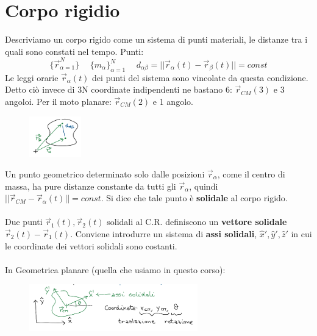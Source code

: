 \newpage
\section{Corpo rigidio}
Descriviamo un corpo rigido come un sistema di punti materiali, le distanze tra
i quali sono constati nel tempo. Punti: 
$$\{\vec{r}_{\alpha=1}^N\} \hspace{15pt} \{m_{\alpha}\}_{\alpha=1}^N \hspace{15pt} d_{\alpha\beta} = ||\vec{r}_{\alpha}(t) - \vec{r}_{\beta}(t)|| = const$$
Le leggi orarie $\vec{r}_{\alpha}(t)$ dei punti del sistema sono vincolate da questa condizione. Detto ciò invece di 3N coordinate indipendenti
ne bastano 6: $\vec{r}_{CM}(3)$ e 3 angoloi. Per il moto planare: $\vec{r}_{CM}(2)$ e 1 angolo.
\begin{figure}[h!]
    \centering
    \includegraphics[width=0.2\textwidth]{images/corpo-rigido.png}
\end{figure}

\hspace{-15pt}Un punto geometrico determinato solo dalle posizioni $\vec{r}_{\alpha}$, come il centro di massa, ha pure distanze constante da tutti gli $\vec{r}_{\alpha}$, quindi $||\vec{r}_{CM} - \vec{r}_{\alpha}(t)|| = const$.
Si dice che tale punto è \textbf{solidale} al corpo rigido.\\\\
Due punti $\vec{r}_1(t), \vec{r}_2(t)$ solidali al C.R. definiscono un \textbf{vettore solidale} $\vec{r}_2(t) - \vec{r}_1(t)$. Conviene introdurre
un sistema di \textbf{assi solidali}, $\hat{x}', \hat{y}', \hat{z}'$ in cui le coordinate dei vettori solidali sono costanti.\\\\
In Geometrica planare (quella che usiamo in questo corso):
\begin{figure}[h!]
    \centering
    \includegraphics[width=0.65\textwidth]{images/geo-planare.png}
\end{figure}

